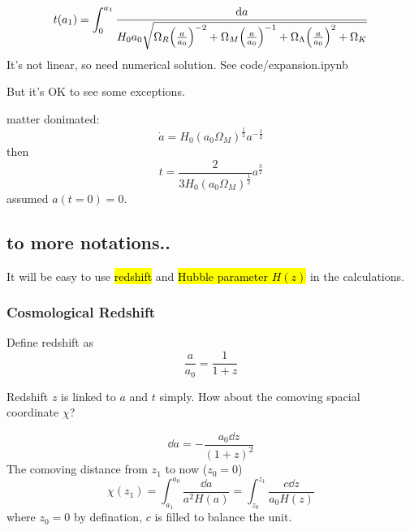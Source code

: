 \begin{equation}
    t(a_1) = \int_{0}^{a_1}  \frac{\dd a}{H_0 a_0 \sqrt{\Omega_R {\qty(\frac{a}{a_0})}^{-2} + \Omega_M {\qty(\frac{a}{a_0})}^{-1} + \Omega_\Lambda {\qty(\frac{a}{a_0})}^{2} + \Omega_K}} 
\end{equation}
It's not linear, so need numerical solution. See code/expansion.ipynb

But it's OK to see some  exceptions.
\begin{block}
    matter donimated:
    \begin{equation}
        \dot{a} = H_0 {(a_0 \Omega_M)}^{\frac{1}{2}}  a^{-\frac{1}{2}} 
    \end{equation}
    then 
    \begin{equation}
        t = \frac{2}{3 H_0 {(a_0 \Omega_M)}^{\frac{1}{2}} } a^{\frac{3}{2}} 
    \end{equation}
    assumed $a(t=0)=0$.
\end{block}

\subsection{to more notations..}

It will be easy to use \hl{redshift} and \hl{Hubble parameter $H(z)$} in the calculations.

\subsubsection{Cosmological Redshift}
Define redshift as
\begin{equation}
    \frac{a}{a_0} = \frac{1}{1+z}
\end{equation}

Redshift $z$ is linked to $a$ and $t$ simply. How about the comoving spacial coordinate $\chi$?

\begin{equation}
    \dd a = - \frac{a_0 \dd z}{{(1+z)}^2}
\end{equation}
The comoving distance from $z_1$ to now ($z_0=0$)
\begin{equation}
    \chi (z_1) = \int_{a_1}^{a_0} \frac{\dd a}{a^2 H(a)} = \int_{z_0}^{z_1} \frac{c \dd{z}}{a_0 H(z)}
\end{equation}
where $z_0=0$ by defination, $c$ is filled to balance the unit. 


